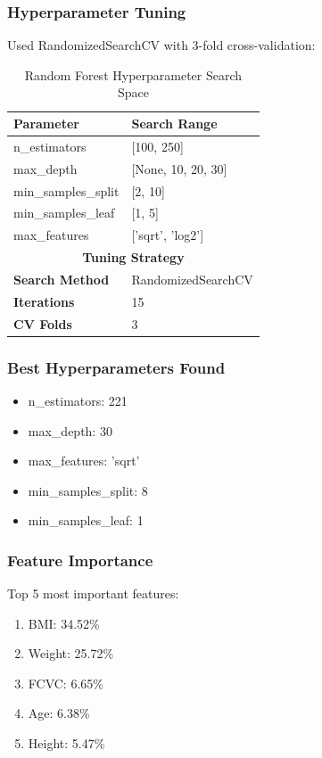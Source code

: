 \documentclass[12pt,a4paper]{article}
\begin{document}
\subsubsection{Hyperparameter Tuning}
Used RandomizedSearchCV with 3-fold cross-validation:

\begin{table}[H]
\centering
\caption{Random Forest Hyperparameter Search Space}
\begin{tabular}{ll}
\toprule
\textbf{Parameter} & \textbf{Search Range} \\
\midrule
n\_estimators & [100, 250] \\
max\_depth & [None, 10, 20, 30] \\
min\_samples\_split & [2, 10] \\
min\_samples\_leaf & [1, 5] \\
max\_features & ['sqrt', 'log2'] \\
\midrule
\multicolumn{2}{c}{\textbf{Tuning Strategy}} \\
\midrule
\textbf{Search Method} & RandomizedSearchCV \\
\textbf{Iterations} & 15 \\
\textbf{CV Folds} & 3 \\
\bottomrule
\end{tabular}
\end{table}

\subsubsection{Best Hyperparameters Found}
\begin{itemize}
    \item n\_estimators: 221
    \item max\_depth: 30
    \item max\_features: 'sqrt'
    \item min\_samples\_split: 8
    \item min\_samples\_leaf: 1
\end{itemize}

\subsubsection{Feature Importance}
Top 5 most important features:
\begin{enumerate}
    \item BMI: 34.52\%
    \item Weight: 25.72\%
    \item FCVC: 6.65\%
    \item Age: 6.38\%
    \item Height: 5.47\%
\end{enumerate}
\end{document}
